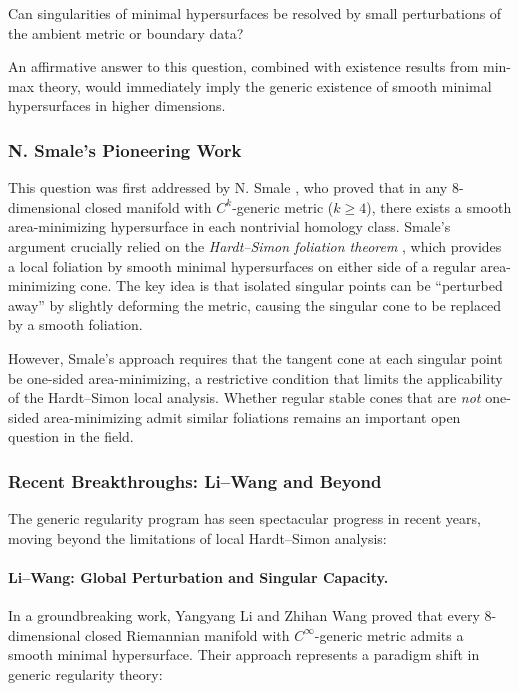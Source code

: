 \begin{question}\label{q:generic-regularity}
Can singularities of minimal hypersurfaces be resolved by small perturbations of the ambient metric
or boundary data?
\end{question}

An affirmative answer to this question, combined with existence results from min-max theory, would
immediately imply the generic existence of smooth minimal hypersurfaces in higher dimensions.

\subsubsection{N. Smale's Pioneering Work}

This question was first addressed by N. Smale \cite{Sma93}, who proved that in any $8$-dimensional
closed manifold with $C^k$-generic metric ($k \geq 4$), there exists a smooth area-minimizing
hypersurface in each nontrivial homology class. Smale's argument crucially relied on the
\emph{Hardt--Simon foliation theorem} \cite{HS85}, which provides a local foliation by smooth
minimal hypersurfaces on either side of a regular area-minimizing cone. The key idea is that
isolated singular points can be ``perturbed away'' by slightly deforming the metric, causing the
singular cone to be replaced by a smooth foliation.

However, Smale's approach requires that the tangent cone at each singular point be one-sided
area-minimizing, a restrictive condition that limits the applicability of the Hardt--Simon local
analysis. Whether regular stable cones that are \emph{not} one-sided area-minimizing admit similar
foliations remains an important open question in the field.

\subsubsection{Recent Breakthroughs: Li--Wang and Beyond}

The generic regularity program has seen spectacular progress in recent years, moving beyond the
limitations of local Hardt--Simon analysis:

\paragraph{Li--Wang: Global Perturbation and Singular Capacity.}
In a groundbreaking work, Yangyang Li and Zhihan Wang \cite{LiWang-dim8} proved that every
$8$-dimensional closed Riemannian manifold with $C^\infty$-generic metric admits a smooth minimal
hypersurface. Their approach represents a paradigm shift in generic regularity theory:

